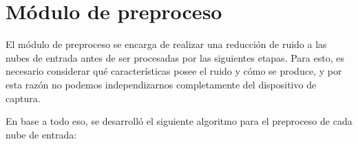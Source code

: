 \section{Módulo de preproceso}
El módulo de preproceso se encarga de realizar una reducción de ruido a las nubes de entrada
antes de ser procesadas por las siguientes etapas.
Para esto, es necesario considerar qué características posee el ruido y cómo se produce,
y por esta razón no podemos independizarnos completamente del dispositivo de captura.

En base a todo eso, se desarrolló el siguiente algoritmo
para el preproceso de cada nube de entrada:
